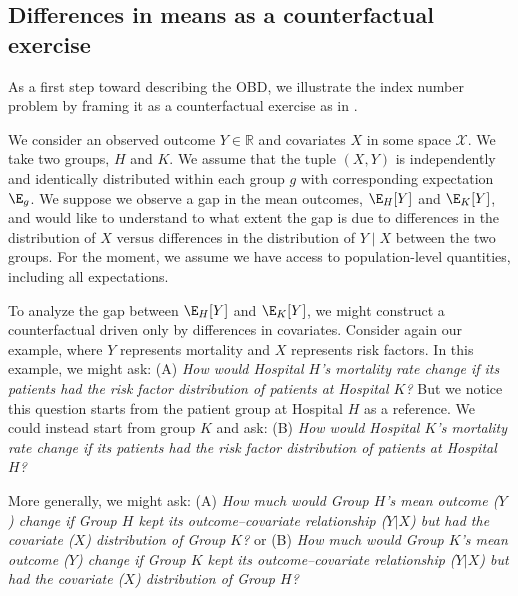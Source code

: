 \subsection{Differences in means as a counterfactual exercise} 
\label{sec:counterfactual_example}

As a first step toward describing the OBD, we illustrate the index number problem by framing it as a counterfactual exercise as in \citet{fortinLemieuxFirpo2011}.

We consider an observed outcome $Y \in \mathbb{R}$ and covariates $X$ in some space $\mathcal{X}$. We take two groups, $H$ and $K$. We assume that the tuple $(X,Y)$ is independently and identically distributed within each group $g$ with corresponding expectation $\E_g$. We suppose we observe a gap in the mean outcomes, $\E_H[Y]$ and $\E_K[Y]$, and would like to understand to what extent the gap is due to differences in the distribution of $X$ versus differences in the distribution of $Y\mid X$ between the two groups. 
For the moment, we assume we have access to population-level quantities, including all expectations.

To analyze the gap between $\E_H[Y]$ and $\E_K[Y]$, we might construct a counterfactual driven only by differences in covariates.
Consider again our example, where $Y$ represents mortality and $X$ represents risk factors.
In this example, we might ask:
(A) \emph{How would Hospital $H$'s mortality rate change if its patients had the risk factor distribution of patients at Hospital $K$?}
But we notice this question starts from the patient group at Hospital $H$ as a reference. We could instead start from group $K$ and ask:
(B) \emph{How would Hospital $K$'s mortality rate change if its patients had the risk factor distribution of patients at Hospital $H$?}


More generally, we might ask:
(A) \emph{How much would Group $H$'s mean outcome ($Y$) change if Group $H$ kept its outcome--covariate relationship ($Y|X$) but had the covariate ($X$) distribution of Group $K$?}
or 
(B) \emph{How much would Group $K$'s mean outcome ($Y$) change if Group $K$ kept its outcome--covariate relationship ($Y|X$) but had the covariate ($X$) distribution of Group $H$?}

